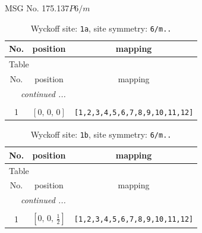 \documentclass[fleqn,8pt]{jsarticle}
\begin{document}
\setcounter{MaxMatrixCols}{32}

\renewcommand{\tablename}{Table~}
\renewcommand{\figurename}{Figure~}
\begin{center}
\LARGE
MSG No. 175.137\quad$P6/m$
\end{center}
\renewcommand{\arraystretch}{1.2}
\begin{longtable}{ccc}
\caption{Wyckoff site: {\tt 1a}, site symmetry: {\tt 6/m..}}
 \\
 \hline \hline
No. & position & mapping \\ \hline \endfirsthead

\multicolumn{2}{l}{\tablename\ \thetable{}} \\
 \hline \hline
No. & position & mapping \\ \hline \endhead

 \hline \hline
\multicolumn{2}{r}{\footnotesize\it continued ...} \\ \endfoot

 \hline \hline
\multicolumn{2}{r}{} \\ \endlastfoot

1 & $\left[ 0,\, 0,\, 0 \right]$ & {\tt [1,2,3,4,5,6,7,8,9,10,11,12]} \\
\end{longtable}
\renewcommand{\arraystretch}{1.2}
\begin{longtable}{ccc}
\caption{Wyckoff site: {\tt 1b}, site symmetry: {\tt 6/m..}}
 \\
 \hline \hline
No. & position & mapping \\ \hline \endfirsthead

\multicolumn{2}{l}{\tablename\ \thetable{}} \\
 \hline \hline
No. & position & mapping \\ \hline \endhead

 \hline \hline
\multicolumn{2}{r}{\footnotesize\it continued ...} \\ \endfoot

 \hline \hline
\multicolumn{2}{r}{} \\ \endlastfoot

1 & $\left[ 0,\, 0,\, \frac{1}{2} \right]$ & {\tt [1,2,3,4,5,6,7,8,9,10,11,12]} \\
\end{longtable}
\renewcommand{\arraystretch}{1.2}
\end{document}
